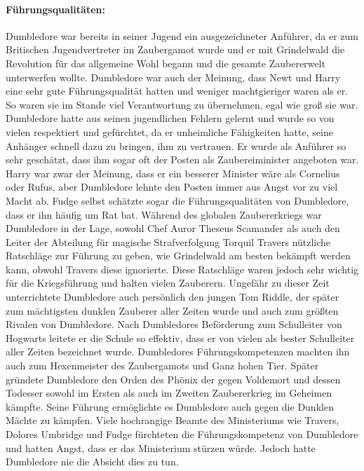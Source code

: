 \documentclass[a4paper, 10pt]{article}
\begin{document}
\paragraph{Führungsqualitäten:}
Dumbledore war bereits in seiner Jugend ein ausgezeichneter Anführer, da er zum Britischen Jugendvertreter im Zaubergamot wurde und er mit Grindelwald die Revolution für das allgemeine Wohl begann und die gesamte Zaubererwelt unterwerfen wollte. Dumbledore war auch der Meinung, dass Newt und Harry eine sehr gute Führungsqualität hatten und weniger machtgieriger waren als er. So waren sie im Stande viel Verantwortung zu übernehmen, egal wie groß sie war. Dumbledore hatte aus seinen jugendlichen Fehlern gelernt und wurde so von vielen respektiert und gefürchtet, da er unheimliche Fähigkeiten hatte, seine Anhänger schnell dazu zu bringen, ihm zu vertrauen. Er wurde als Anführer so sehr geschätzt, dass ihm sogar oft der Posten als Zaubereiminister angeboten war. Harry war zwar der Meinung, dass er ein besserer Minister wäre als Cornelius oder Rufus, aber Dumbledore lehnte den Posten immer aus Angst vor zu viel Macht ab. Fudge selbst schätzte sogar die Führungsqualitäten von Dumbledore, dass er ihn häufig um Rat bat. Während des globalen Zaubererkriegs war Dumbledore in der Lage, sowohl Chef Auror Theseus Scamander als auch den Leiter der Abteilung für magische Strafverfolgung Torquil Travers nützliche Ratschläge zur Führung zu geben, wie Grindelwald am besten bekämpft werden kann, obwohl Travers diese ignorierte. Diese Ratschläge waren jedoch sehr wichtig für die Kriegsführung und halten vielen Zauberern. Ungefähr zu dieser Zeit unterrichtete Dumbledore auch persönlich den jungen Tom Riddle, der später zum mächtigsten dunklen Zauberer aller Zeiten wurde und auch zum größten Rivalen von Dumbledore. Nach Dumbledores Beförderung zum Schulleiter von Hogwarts leitete er die Schule so effektiv, dass er von vielen als bester Schulleiter aller Zeiten bezeichnet wurde. Dumbledores Führungskompetenzen machten ihn auch zum Hexenmeister des Zaubergamots und Ganz hohen Tier. Später gründete Dumbledore den Orden des Phönix der gegen Voldemort und dessen Todesser sowohl im Ersten als auch im Zweiten Zaubererkrieg im Geheimen kämpfte. Seine Führung ermöglichte es Dumbledore auch gegen die Dunklen Mächte zu kämpfen. Viele hochrangige Beamte des Ministeriums
wie Travers, Dolores Umbridge und Fudge fürchteten die Führungskompetenz von Dumbledore und hatten Angst, dass er das Ministerium stürzen würde. Jedoch hatte Dumbledore nie die Absicht dies zu tun.
\end{document}
